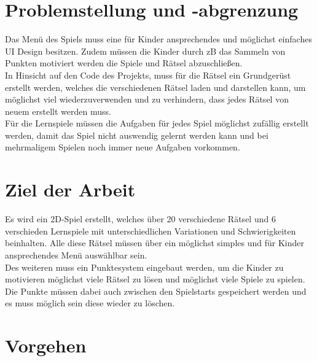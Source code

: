 \section{Problemstellung und -abgrenzung}
\label{sec:problemstellung}

Das Menü des Spiels muss eine für Kinder ansprechendes und möglichst einfaches UI Design besitzen. Zudem müssen die Kinder durch zB das Sammeln von Punkten motiviert werden die Spiele und Rätsel abzuschließen.\\

In Hinsicht auf den Code des Projekts, muss für die Rätsel ein Grundgerüst erstellt werden, welches die verschiedenen Rätsel laden und darstellen kann, um möglichst viel wiederzuverwenden und zu verhindern, dass jedes Rätsel von neuem erstellt werden muss.\\

Für die Lernspiele müssen die Aufgaben für jedes Spiel möglichst zufällig erstellt werden, damit das Spiel nicht auswendig gelernt werden kann und bei mehrmaligem Spielen noch immer neue Aufgaben vorkommen.

\section{Ziel der Arbeit}
\label{sec:ziel}

Es wird ein 2D-Spiel erstellt, welches über 20 verschiedene Rätsel und 6 verschieden Lernspiele mit unterschiedlichen Variationen und Schwierigkeiten beinhalten. Alle diese Rätsel müssen über ein möglichst simples und für Kinder ansprechendes Menü auswählbar sein.\\
Des weiteren muss ein Punktesystem eingebaut werden, um die Kinder zu motivieren möglichst viele Rätsel zu lösen und möglichst viele Spiele zu spielen. Die Punkte müssen dabei auch zwischen den Spielstarts gespeichert werden und es muss möglich sein diese wieder zu löschen.

\section{Vorgehen}
\label{sec:vorgehen}

